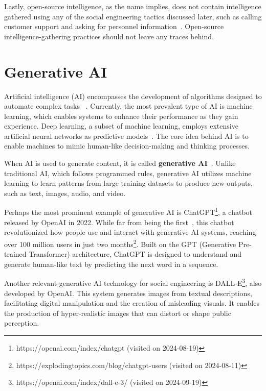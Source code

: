Lastly, open-source intelligence, as the name implies, does not contain intelligence gathered using any of the social engineering tactics discussed later, such as calling customer support and asking for personnel information~\citep{hadnagy_Social_Engineering_The_Science_2018}. Open-source intelligence-gathering practices should not leave any traces behind.





\section{Generative AI}
\begin{comment}
\end{comment}

Artificial intelligence (AI) encompasses the development of algorithms designed to automate complex tasks ~\citep{mirsky_Threat_Offensive_AI_Organizations_2023}. Currently, the most prevalent type of AI is machine learning, which enables systems to enhance their performance as they gain experience. Deep learning, a subset of machine learning, employs extensive artificial neural networks as predictive models~\citep{fakhouri_AI_Driven_Solutions_SE_Attacks_2024}. The core idea behind AI is to enable machines to mimic human-like decision-making and thinking processes.

When AI is used to generate content, it is called \textbf{generative AI}~\citep{goodfellow_Generative_Adversarial_Networks_2020}. Unlike traditional AI, which follows programmed rules, generative AI utilizes machine learning to learn patterns from large training datasets to produce new outputs, such as text, images, audio, and video.

Perhaps the most prominent example of generative AI is ChatGPT\footnote{https://openai.com/index/chatgpt (visited on 2024-08-19)}, a chatbot released by OpenAI in 2022. While far from being the first~\citep{weizenbaum_ELIZA_1996}, this chatbot revolutionized how people use and interact with generative AI systems, reaching over 100 million users in just two months\footnote{https://explodingtopics.com/blog/chatgpt-users (visited on 2024-08-11)}. Built on the GPT (Generative Pre-trained Transformer) architecture, ChatGPT is designed to understand and generate human-like text by predicting the next word in a sequence.

Another relevant generative AI technology for social engineering is DALL-E\footnote{https://openai.com/index/dall-e-3/ (visited on 2024-09-19)}, also developed by OpenAI. This system generates images from textual descriptions, facilitating digital manipulation and the creation of misleading visuals. It enables the production of hyper-realistic images that can distort or shape public perception.
